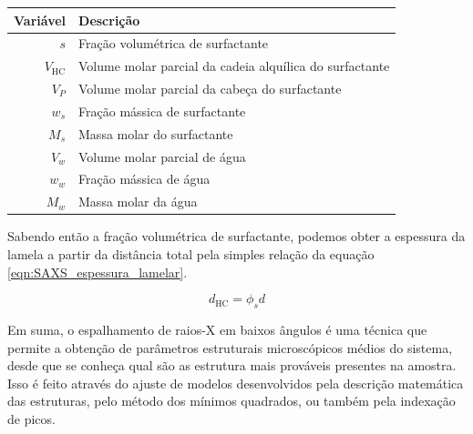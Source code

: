 	
		\begin{table}[H]
			{\begin{tabular}{r l}
				\toprule
				           Variável & Descrição                                               \\ \midrule
				              \(s\) & Fração volumétrica de surfactante                       \\
				\(V_{\mathrm{HC}}\) & Volume molar parcial da cadeia alquílica do surfactante \\
				          \(V_{P}\) & Volume molar parcial da cabeça do surfactante           \\
				          \(w_{s}\) & Fração mássica de surfactante                           \\
				          \(M_{s}\) & Massa molar do surfactante                              \\ \midrule
				          \(V_{w}\) & Volume molar parcial de água                            \\
				          \(w_{w}\) & Fração mássica de água                                  \\
				          \(M_{w}\) & Massa molar da água                                     \\ \bottomrule
			\end{tabular}
			}%
			{}%
		\end{table}

		
		Sabendo então a fração volumétrica de surfactante, podemos obter a espessura da lamela a partir da distância total pela simples relação da equação \ref{eqn:SAXS_espessura_lamelar}.
		
		\begin{equation} \label{eqn:SAXS_espessura_lamelar}
			d_{\text{HC}} = \phi_s d
		\end{equation}
		
		Em suma, o espalhamento de raios-X em baixos ângulos é uma técnica que permite a obtenção de parâmetros estruturais microscópicos médios do sistema, desde que se conheça qual são as estrutura mais prováveis presentes na amostra. Isso é feito através do ajuste de modelos desenvolvidos pela descrição matemática das estruturas, pelo método dos mínimos quadrados, ou também pela indexação de picos.
		
